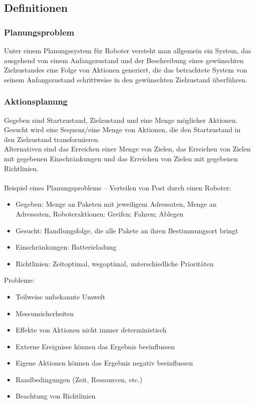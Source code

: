 \setlength\parindent{0pt}

\subsection{Definitionen}

\subsubsection{Planungsproblem}
Unter einem Planungssystem für Roboter versteht man allgemein ein System, das ausgehend von einem Anfangszustand und der Beschreibung eines gewünschten Zielzustandes eine Folge von Aktionen generiert, die das betrachtete System von seinem Anfangszustand schrittweise in den gewünschten Zielzustand überführen.

\subsubsection{Aktionsplanung}
Gegeben sind Startzustand, Zielzustand und eine Menge möglicher Aktionen.
Gesucht wird eine Sequenz/eine Menge von Aktionen, die den Startzustand in den Zielzustand transformieren.\\
Alternativen sind das Erreichen einer Menge von Zielen, das Erreichen von Zielen mit gegebenen Einschränkungen und das Erreichen von Zielen mit gegebenen Richtlinien.\\ \\
Beispiel eines Planungsproblems -- Verteilen von Post durch einen Roboter:
\begin{itemize}
	\item Gegeben: Menge an Paketen mit jeweiligem Adressaten, Menge an Adressaten, Roboteraktionen: Greifen; Fahren; Ablegen
	\item Gesucht: Handlungsfolge, die alle Pakete an ihren Bestimmungsort bringt
	\item Einschränkungen: Batterieladung
	\item Richtlinien: Zeitoptimal, wegoptimal, unterschiedliche Prioritäten
\end{itemize}

Probleme:
\begin{itemize}
	\item Teilweise unbekannte Umwelt
	\item Messunsicherheiten
	\item Effekte von Aktionen nicht immer deterministisch
	\item Externe Ereignisse können das Ergebnis beeinflussen
	\item Eigene Aktionen können das Ergebnis negativ beeinflussen
	\item Randbedingungen (Zeit, Ressourcen, etc.)
	\item Beachtung von Richtlinien
\end{itemize}

